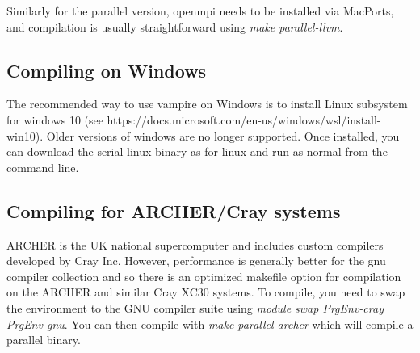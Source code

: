 Similarly for the parallel version, openmpi needs to be installed via MacPorts, and compilation is usually straightforward using \textit{make parallel-llvm}.

\subsection*{Compiling on Windows}
The recommended way to use vampire on Windows is to install Linux subsystem for windows 10 (see https://docs.microsoft.com/en-us/windows/wsl/install-win10). Older versions of windows are no longer supported. Once installed, you can download the serial linux binary as for linux and run as normal from the command line.



\subsection*{Compiling for ARCHER/Cray systems}
ARCHER is the UK national supercomputer and includes custom compilers developed by Cray Inc. However, performance is generally better for the gnu compiler collection and so there is an optimized makefile option for compilation on the ARCHER and similar Cray XC30 systems. To compile, you need to swap the environment to the GNU compiler suite using \textit{module swap PrgEnv-cray PrgEnv-gnu}. You can then compile with \textit{make parallel-archer} which will compile a parallel binary.


